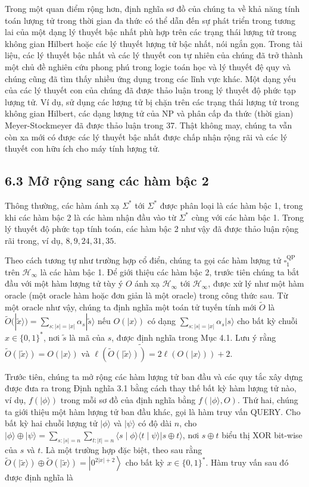 \documentclass[10pt]{article}
\begin{document}
Trong một quan điểm rộng hơn, định nghĩa sơ đồ của chúng ta về khả năng tính toán lượng tử trong thời gian đa thức có thể dẫn đến sự phát triển trong tương lai của một dạng lý thuyết bậc nhất phù hợp trên các trạng thái lượng tử trong không gian Hilbert hoặc các lý thuyết lượng tử bậc nhất, nói ngắn gọn. Trong tài liệu, các lý thuyết bậc nhất và các lý thuyết con tự nhiên của chúng đã trở thành một chủ đề nghiên cứu phong phú trong logic toán học và lý thuyết đệ quy và chúng cũng đã tìm thấy nhiều ứng dụng trong các lĩnh vực khác. Một dạng yếu của các lý thuyết con của chúng đã được thảo luận trong lý thuyết độ phức tạp lượng tử. Ví dụ, sử dụng các lượng tử bị chặn trên các trạng thái lượng tử trong không gian Hilbert, các dạng lượng tử của NP và phân cấp đa thức (thời gian) Meyer-Stockmeyer đã được thảo luận trong 37. Thật không may, chúng ta vẫn còn xa mới có được các lý thuyết bậc nhất được chấp nhận rộng rãi và các lý thuyết con hữu ích cho máy tính lượng tử.

\subsection*{6.3 Mở rộng sang các hàm bậc 2}
Thông thường, các hàm ánh xạ $\Sigma^{*}$ tới $\Sigma^{*}$ được phân loại là các hàm bậc 1, trong khi các hàm bậc 2 là các hàm nhận đầu vào từ $\Sigma^{*}$ cùng với các hàm bậc 1. Trong lý thuyết độ phức tạp tính toán, các hàm bậc 2 như vậy đã được thảo luận rộng rãi trong, ví dụ, $8,9,24,31,35$.

Theo cách tương tự như trường hợp cổ điển, chúng ta gọi các hàm lượng tử $\square_{1}^{\mathrm{QP}}$ trên $\mathcal{H}_{\infty}$ là các hàm bậc 1. Để giới thiệu các hàm bậc 2, trước tiên chúng ta bắt đầu với một hàm lượng tử tùy ý $O$ ánh xạ $\mathcal{H}_{\infty}$ tới $\mathcal{H}_{\infty}$, được xử lý như một hàm oracle (một oracle hàm hoặc đơn giản là một oracle) trong công thức sau. Từ một oracle như vậy, chúng ta định nghĩa một toán tử tuyến tính mới $\tilde{O}$ là $\tilde{O}(|\tilde{x}\rangle)=\sum_{s:|s|=|x|} \alpha_{s}|\tilde{s}\rangle$ nếu $O(|x\rangle)$ có dạng $\sum_{s:|s|=|x|} \alpha_{s}|s\rangle$ cho bất kỳ chuỗi $x \in\{0,1\}^{*}$, nơi $\tilde{s}$ là mã của $s$, được định nghĩa trong Mục 4.1. Lưu ý rằng $\tilde{O}(|\tilde{x}\rangle)= \widetilde{O(|x\rangle) \text { và } \ell(\tilde{O}(|\tilde{x}\rangle))=2 \ell(O(|x\rangle))+2 \text {. }}$

Trước tiên, chúng ta mở rộng các hàm lượng tử ban đầu và các quy tắc xây dựng được đưa ra trong Định nghĩa 3.1 bằng cách thay thế bất kỳ hàm lượng tử nào, ví dụ, $f(|\phi\rangle)$ trong mỗi sơ đồ của định nghĩa bằng $f(|\phi\rangle, O)$. Thứ hai, chúng ta giới thiệu một hàm lượng tử ban đầu khác, gọi là hàm truy vấn QUERY. Cho bất kỳ hai chuỗi lượng tử $|\phi\rangle$ và $|\psi\rangle$ có độ dài $n$, cho $|\phi\rangle \oplus|\psi\rangle=\sum_{s:|s|=n} \sum_{t:|t|=n}\langle s \mid \phi\rangle\langle t \mid \psi\rangle|s \oplus t\rangle$, nơi $s \oplus t$ biểu thị XOR bit-wise của $s$ và $t$. Là một trường hợp đặc biệt, theo sau rằng $\tilde{O}(|\tilde{x}\rangle) \oplus \tilde{O}(|\tilde{x}\rangle)=\left|0^{2|x|+2}\right\rangle$ cho bất kỳ $x \in\{0,1\}^{*}$. Hàm truy vấn sau đó được định nghĩa là
\end{document}
